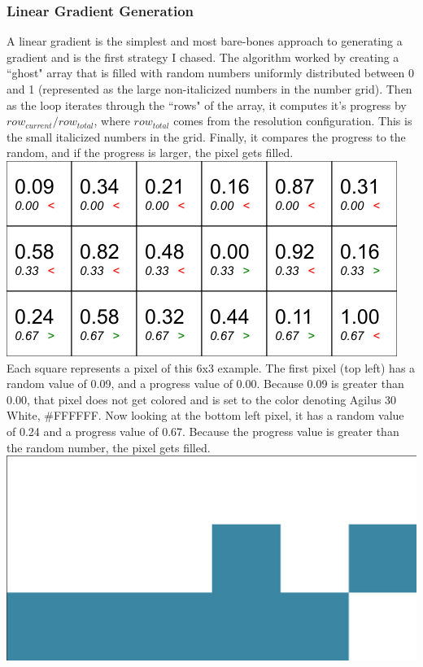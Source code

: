 \documentclass{article}
\begin{document}
\begin{multicols}{2}
\subsubsection{Linear Gradient Generation}
A linear gradient is the simplest and most bare-bones approach to generating a gradient and is the first strategy I chased. The algorithm worked by creating a ``ghost" array that is filled with random numbers uniformly distributed between 0 and 1 (represented as the large non-italicized numbers in the number grid). Then as the loop iterates through the ``rows" of the array, it computes it's progress by $row_{current}/row_{total}$, where $row_{total}$ comes from the resolution configuration. This is the small italicized numbers in the grid. Finally, it compares the progress to the random, and if the progress is larger, the pixel gets filled.
\\

\noindent
\includegraphics[width=\columnwidth]{slice_000_rand}
\\

\noindent
Each square represents a pixel of this 6x3 example. The first pixel (top left) has a random value of 0.09, and a progress value of 0.00. Because 0.09 is greater than 0.00, that pixel does not get colored and is set to the color denoting Agilus 30 White, \#FFFFFF. Now looking at the bottom left pixel, it has a random value of 0.24 and a progress value of 0.67. Because the progress value is greater than the random number, the pixel gets filled.
\\

\noindent
\includegraphics[width=\columnwidth]{slice_000_scaled}
\\


\end{multicols}
\end{document}
